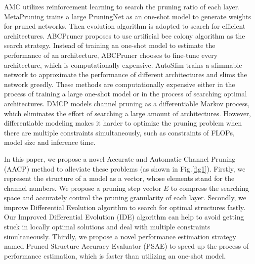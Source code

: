 \documentclass[final]{cvpr}
\begin{document}
AMC \cite{he2018amc} utilizes reinforcement learning to search the pruning ratio of each layer. MetaPruning \cite{liu2019metapruning}
trains a large PruningNet as an one-shot model to generate weights for pruned networks. Then evolution algorithm is adopted to search for 
efficient architectures. ABCPruner \cite{lin2020channel} proposes to use artificial bee colony algorithm as the search strategy. 
Instead of training an one-shot model to estimate the performance of an architecture, ABCPruner chooses to fine-tune every architecture,
which is computationally expensive. AutoSlim \cite{yu2019autoslim} trains a slimmable network to approximate the performance of different architectures 
and slims the network greedly. These methods are computationally expensive either in the process of training a large one-shot model or in 
the process of searching optimal architectures. DMCP \cite{guo2020dmcp} models channel pruning as a differentiable Markov process,
which eliminates the effort of searching a large amount of architectures. However, differentiable modeling makes it harder to optimize
the pruning problem when there are multiple constraints simultaneously, such as constraints of FLOPs, model size and inference time.

In this paper, we propose a novel Accurate and Automatic Channel Pruning (AACP) method to alleviate these problems (as shown in Fig.\ref{fig1}). Firstly, 
we represent the structure of a model as a vector, whose elements stand for the channel numbers. 
We propose a pruning step vector $E$ to compress the searching space and accurately control the pruning granularity of each layer. Secondly, 
we improve Differential Evolution algorithm to search for
optimal structures fastly. Our Improved Differential Evolution (IDE) algorithm can help to avoid getting stuck in
locally optimal solutions and deal with multiple constraints simultaneously. Thirdly, we propose a novel performance estimation strategy named 
Pruned Structure Accuracy Evaluator (PSAE) to speed up the process of performance estimation, which is faster than utilizing an one-shot model.
\end{document}
